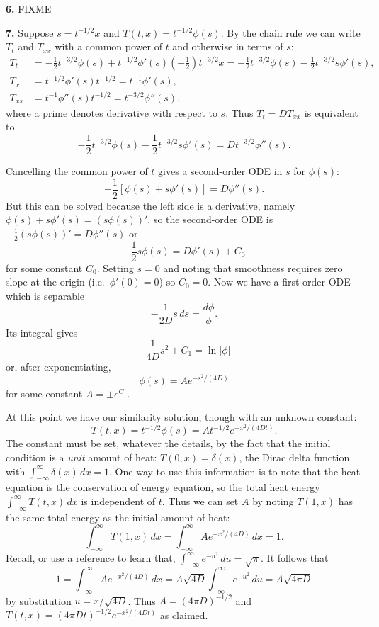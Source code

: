 \documentclass[10pt]{amsart}
\newcommand{\prob}[1]{\bigskip\noindent\large\textbf{#1.}\normalsize }
\begin{document}
\prob{6}  FIXME

\prob{7}  Suppose $s = t^{-1/2} x$ and $T(t,x)=t^{-1/2} \phi(s)$.  By the chain rule we can write $T_t$ and $T_{xx}$ with a common power of $t$ and otherwise in terms of $s$:
\begin{align*}
T_t &= - \frac{1}{2} t^{-3/2} \phi(s) + t^{-1/2} \phi'(s) \left(-\frac{1}{2}\right) t^{-3/2} x = - \frac{1}{2} t^{-3/2} \phi(s) - \frac{1}{2} t^{-3/2} s \phi'(s), \\
T_x &= t^{-1/2} \phi'(s) t^{-1/2} = t^{-1} \phi'(s), \\
T_{xx} &= t^{-1} \phi''(s) t^{-1/2} = t^{-3/2} \phi''(s),
\end{align*}
where a prime denotes derivative with respect to $s$.  Thus $T_t = D T_{xx}$ is equivalent to
    $$- \frac{1}{2} t^{-3/2} \phi(s) - \frac{1}{2} t^{-3/2} s \phi'(s) = D t^{-3/2} \phi''(s).$$

Cancelling the common power of $t$ gives a second-order ODE in $s$ for $\phi(s)$:
    $$- \frac{1}{2} \left[\phi(s) + s \phi'(s)\right] = D \phi''(s).$$
But this can be solved because the left side is a derivative, namely $\phi(s) + s \phi'(s) = \left(s \phi(s)\right)'$, so the second-order ODE is $- \frac{1}{2} \left(s \phi(s)\right)' = D \phi''(s)$ or
    $$- \frac{1}{2} s \phi(s) = D \phi'(s) + C_0$$
for some constant $C_0$.  Setting $s=0$ and noting that smoothness requires zero slope at the origin (i.e.~$\phi'(0)=0$) so $C_0=0$.  Now we have a first-order ODE which is separable
    $$- \frac{1}{2D} s \,ds = \frac{d\phi}{\phi}.$$
Its integral gives
    $$- \frac{1}{4D} s^2 + C_1 = \ln|\phi|$$
or, after exponentiating,
    $$\phi(s) = A e^{- s^2/(4D)}$$
for some constant $A = \pm e^{C_1}$.

At this point we have our similarity solution, though with an unknown constant:
    $$T(t,x) = t^{-1/2} \phi(s) = A t^{-1/2} e^{- x^2/(4Dt)}.$$
The constant must be set, whatever the details, by the fact that the initial condition is a \emph{unit} amount of heat: $T(0,x) = \delta(x)$, the Dirac delta function with $\int_{-\infty}^\infty \delta(x)\,dx = 1$.  One way to use this information is to note that the heat equation is the conservation of energy equation, so the total heat energy $\int_{-\infty}^\infty T(t,x)\,dx$ is independent of $t$.  Thus we can set $A$ by noting $T(1,x)$ has the same total energy as the initial amount of heat:
    $$\int_{-\infty}^\infty T(1,x)\,dx = \int_{-\infty}^\infty A e^{- x^2/(4D)}\,dx = 1.$$
Recall, or use a reference to learn that, $\int_{-\infty}^\infty e^{- u^2}\,du = \sqrt{\pi}$.  It follows that
    $$1 = \int_{-\infty}^\infty A e^{- x^2/(4D)}\,dx = A \sqrt{4D} \int_{-\infty}^\infty e^{- u^2}\,du = A \sqrt{4\pi D}$$
by substitution $u=x/\sqrt{4D}$.  Thus $A = (4\pi D)^{-1/2}$ and $T(t,x) = (4\pi D t)^{-1/2} e^{- x^2/(4Dt)}$ as claimed.
\end{document}
